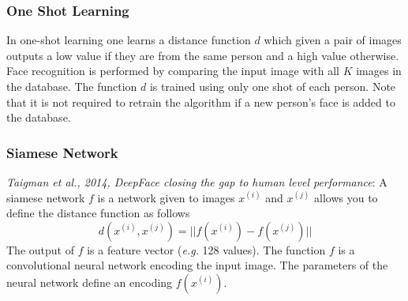 \documentclass{article}
\begin{document}
\subsubsection{One Shot Learning}
In one-shot learning one learns a distance function $d$
which given a pair of images outputs a low value if they are from the same person and a high value otherwise.
Face recognition is performed by comparing the input image with all $K$ images in the database.
The function $d$ is trained using only one shot of each person.
Note that it is not required to retrain the algorithm if a new person's face is added to the database.

\subsubsection{Siamese Network}\label{cha:siamese}
\emph{Taigman et al., 2014, DeepFace closing the gap to human level performance}:
A siamese network $f$ is a network given to images $x^{(i)}$ and $x^{(j)}$ allows you to define the distance function as follows
\begin{equation}
  d(x^{(i)},x^{(j)}) = ||f(x^{(i)})-f(x^{(j)})||
\end{equation}
The output of $f$ is a feature vector (\emph{e.g.} 128 values).
The function $f$ is a convolutional neural network encoding the input image.
The parameters of the neural network define an encoding $f(x^{(i)})$.
\end{document}

